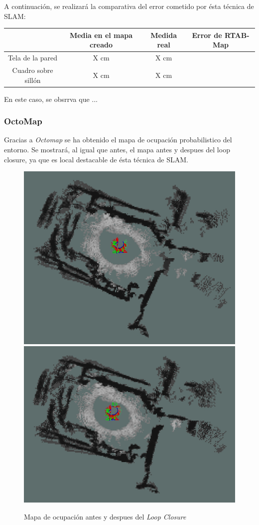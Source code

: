 A continuación, se realizará la comparativa del error cometido por ésta técnica de SLAM:
\begin{center}
    \begin{tabular}{ c | c | c | c }
         & Media en el mapa creado & Medida real & Error de RTAB-Map\\
         \hline
         Tela de la pared & X cm & X cm \\
         Cuadro sobre sillón & X cm & X cm \\
    \end{tabular}
\end{center}
    
    En este caso, se obsrrva que ...

    \subsubsection{OctoMap}
Gracias a \textit{Octomap} se ha obtenido el mapa de ocupación probabilistico del entorno. Se mostrará, al igual que antes, el mapa antes y despues del loop closure, ya que es local
destacable de ésta técnica de SLAM.
\begin{figure}[h!]
    \centering
    \includegraphics[width=.4\textwidth]{images/slam/bag3_occupGrid_noLC}
    \includegraphics[width=.435\textwidth]{images/slam/bag3_occupGrid_LC}
    \caption{Mapa de ocupación antes y despues del \textit{Loop Closure}}
\end{figure}

